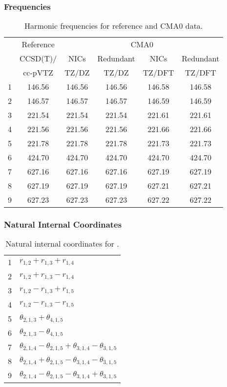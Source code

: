 \documentclass[10pt,oneside]{article}
\begin{document}
\begin{table}[h!]
\subsubsection*{Frequencies}
\centering
\caption{Harmonic frequencies for reference and CMA0 data.}
\begin{tabular}{cccccc}
\toprule
{} & Reference & \multicolumn{4}{c}{CMA0} \\
{} &  CCSD(T)/ &   NICs &  Redundant &   NICs & Redundant \\
{} &   cc-pVTZ &  TZ/DZ &      TZ/DZ & TZ/DFT &    TZ/DFT \\
\midrule
1 &    146.56 & 146.56 &     146.56 & 146.58 &    146.58 \\
2 &    146.57 & 146.57 &     146.57 & 146.59 &    146.59 \\
3 &    221.54 & 221.54 &     221.54 & 221.61 &    221.61 \\
4 &    221.56 & 221.56 &     221.56 & 221.66 &    221.66 \\
5 &    221.78 & 221.78 &     221.78 & 221.73 &    221.73 \\
6 &    424.70 & 424.70 &     424.70 & 424.70 &    424.70 \\
7 &    627.16 & 627.16 &     627.16 & 627.19 &    627.19 \\
8 &    627.19 & 627.19 &     627.19 & 627.21 &    627.21 \\
9 &    627.23 & 627.23 &     627.23 & 627.22 &    627.22 \\
\bottomrule
\end{tabular}
\end{table}

\begin{table}[h!]
\subsubsection*{Natural Internal Coordinates}
\centering
\caption{Natural internal coordinates for .}
\small
\begin{tabular}{ll}
\toprule
  1   & $r_{1,2} + r_{1,3} + r_{1,4}$ \\
  2   & $r_{1,2} + r_{1,3} - r_{1,4}$ \\
  3   & $r_{1,2} - r_{1,3} + r_{1,5}$ \\
  4   & $r_{1,2} - r_{1,3} - r_{1,5}$ \\
  5   & $\theta_{2,1,3} + \theta_{4,1,5}$ \\
  6   & $\theta_{2,1,3} - \theta_{4,1,5}$ \\
  7   & $\theta_{2,1,4} - \theta_{2,1,5} + \theta_{3,1,4} - \theta_{3,1,5}$ \\
  8   & $\theta_{2,1,4} + \theta_{2,1,5} - \theta_{3,1,4} - \theta_{3,1,5}$ \\
  9   & $\theta_{2,1,4} - \theta_{2,1,5} - \theta_{3,1,4} + \theta_{3,1,5}$ \\
\bottomrule
\end{tabular}
\end{table}
\end{document}
